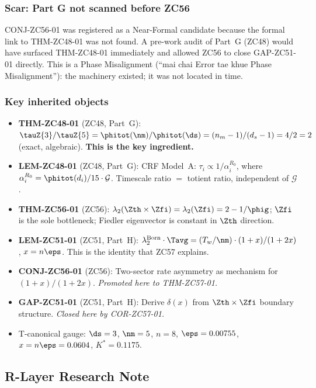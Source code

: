 \documentclass[12pt, a4paper]{article}
\begin{document}
\subsubsection{Scar: Part G not scanned before ZC56}

CONJ-ZC56-01 was registered as a Near-Formal candidate because
the formal link to THM-ZC48-01 was not found.  A pre-work audit
of Part~G (ZC48) would have surfaced THM-ZC48-01 immediately
and allowed ZC56 to close GAP-ZC51-01 directly.  This is a
Phase Misalignment (``mai chai Error tae khue Phase Misalignment''):
the machinery existed; it was not located in time.

\subsubsection{Key inherited objects}

\begin{itemize}[leftmargin=2em, noitemsep]
\item \textbf{THM-ZC48-01} (ZC48, Part~G):
  $\tauZ{3}/\tauZ{5} = \phitot(\nm)/\phitot(\ds)
  = (n_m-1)/(d_s-1) = 4/2 = 2$ (exact, algebraic).
  \textbf{This is the key ingredient.}
\item \textbf{LEM-ZC48-01} (ZC48, Part~G):
  CRF Model~A: $\tau_i\propto 1/\alpha_i^{R_0}$,
  where $\alpha_i^{R_0}=\phitot(d_i)/15\cdot\mathcal{G}$.
  Timescale ratio $=$ totient ratio, independent of $\mathcal{G}$.
\item \textbf{THM-ZC56-01} (ZC56):
  $\lambda_2(\Zth\times\Zfi)=\lambda_2(\Zfi)=2-1/\phig$;
  $\Zfi$ is the sole bottleneck; Fiedler eigenvector is constant
  in $\Zth$ direction.
\item \textbf{LEM-ZC51-01} (ZC51, Part~H):
  $\lambda_2^{\rm Born}\cdot\Tavg
  = (T_w/\nm)\cdot(1+x)/(1+2x)$, $x=n\eps$.
  This is the identity that ZC57 explains.
\item \textbf{CONJ-ZC56-01} (ZC56):
  Two-sector rate asymmetry as mechanism for $(1+x)/(1+2x)$.
  \emph{Promoted here to THM-ZC57-01.}
\item \textbf{GAP-ZC51-01} (ZC51, Part~H):
  Derive $\delta(x)$ from $\Zth\times\Zfi$ boundary structure.
  \emph{Closed here by COR-ZC57-01.}
\item T-canonical gauge: $\ds=3$, $\nm=5$, $n=8$, $\eps=0.00755$,
  $x=n\eps=0.0604$, $K^*=0.1175$.
\end{itemize}

\subsection{R-Layer Research Note}
\end{document}
